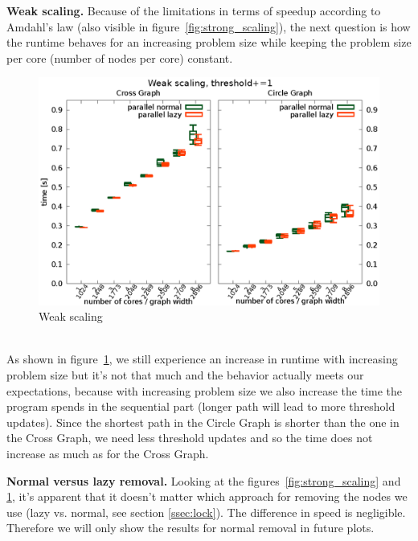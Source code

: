 \documentclass[letterpaper]{article}
\newcommand{\mypar}[1]{{\bf #1.}}
\begin{document}
\mypar{Weak scaling}
Because of the limitations in terms of speedup according to Amdahl's law (also visible in figure~\ref{fig:strong_scaling}), the next question is how the runtime behaves for an increasing problem size while keeping the problem size per core (number of nodes per core) constant.
\begin{figure}[h]\centering
  \includegraphics[scale=0.558]{weak_scaling.eps}
  \caption{Weak scaling\label{fig:weak_scaling}}
\end{figure}\\
As shown in figure~\ref{fig:weak_scaling}, we still experience an increase in runtime with increasing problem size but it's not that much and the behavior actually meets our expectations, because with increasing problem size we also increase the time the program spends in the sequential part (longer path will lead to more threshold updates). Since the shortest path in the Circle Graph is shorter than the one in the Cross Graph, we need less threshold updates and so the time does not increase as much as for the Cross Graph.

\mypar{Normal versus lazy removal} Looking at the figures~\ref{fig:strong_scaling} and \ref{fig:weak_scaling}, it's apparent that it doesn't matter which approach for removing the nodes we use (lazy vs. normal, see section \ref{ssec:lock}). The difference in speed is negligible. Therefore we will only show the results for normal removal in future plots.
\end{document}
